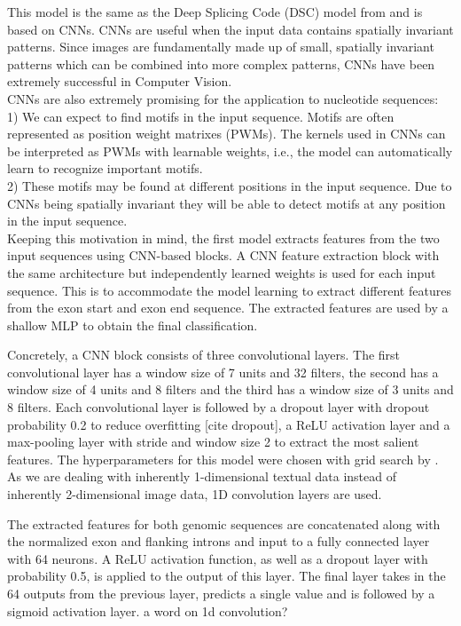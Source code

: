 This model is the same as the Deep Splicing Code (DSC) model from \cite{dsc} and is based on CNNs.
CNNs are useful when the input data contains spatially invariant patterns. Since images are fundamentally made up of small, spatially invariant patterns which can be combined into more complex patterns, CNNs have been extremely successful in Computer Vision.\\
CNNs are also extremely promising for the application to nucleotide sequences: \\
1) We can expect to find motifs in the input sequence. Motifs are often represented as position weight matrixes (PWMs). The kernels used in CNNs can be interpreted as PWMs with learnable weights, i.e., the model can automatically learn to recognize important motifs.\\
2) These motifs may be found at different positions in the input sequence. Due to CNNs being spatially invariant they will be able to detect motifs at any position in the input sequence. \\
Keeping this motivation in mind, the first model extracts features from the two input sequences using CNN-based blocks. A CNN feature extraction block with the same architecture but independently learned weights is used for each input sequence. This is to accommodate the model learning to extract different features from the exon start and exon end sequence. The extracted features are used by a shallow MLP to obtain the final classification. 

Concretely, a CNN block consists of three convolutional layers. The first convolutional layer has a window size of 7 units and 32 filters, the second has a window size of 4 units and 8 filters and the third has a window size of 3 units and 8 filters. Each convolutional layer is followed by a dropout layer with dropout probability 0.2 to reduce overfitting [cite dropout], a ReLU activation layer and a max-pooling layer with stride and window size 2 to extract the most salient features. The hyperparameters for this model were chosen with grid search by \cite{dsc}. As we are dealing with inherently 1-dimensional textual data instead of inherently 2-dimensional image data, 1D convolution layers are used.




The extracted features for both genomic sequences are concatenated along with the normalized exon and flanking introns and input to a fully connected layer with 64 neurons. A ReLU activation function, as well as a dropout layer with probability 0.5, is applied to the output of this layer. The final layer takes in the 64 outputs from the previous layer, predicts a single value and is followed by a sigmoid activation layer.
a word on 1d convolution?
